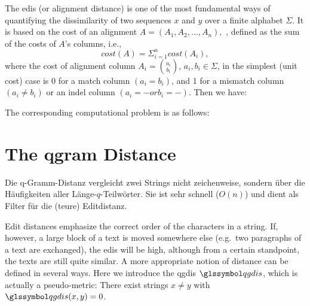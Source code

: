 The \gls{edis} (or \gls{alignment distance}) is one of the most fundamental ways of quantifying the
dissimilarity of two sequences $x$ and $y$ over a finite alphabet $\Sigma$.
It is based on the cost of an alignment $A = (A_1, A_2, \dots , A_n),$ , defined as the sum of the costs of $A$’s
columns,
i.e.,
\[
cost(A) = \Sigma^n_{i=1} cost(A_i),
\]
where the cost of alignment column $A_i = \binom{a_i}{b_i}$, $a_i, b_i \in \Sigma$, in the simplest (unit cost) case is 0 for a match column $(a_i = b_i)$, and 1 for a mismatch column $(a_i \neq b_i)$ or an indel column $(a_i = - or b_i = -)$.
Then we have:


\noindent The corresponding computational problem is as follows:



\section{The \gls{qgram} Distance}\label{sec:the-q-gram-distance}
\begin{idee}
    Die q-Gramm-Distanz vergleicht zwei Strings nicht zeichenweise, sondern über die
    Häufigkeiten aller Länge-$q$-Teilwörter.
    Sie ist sehr schnell ($O(n)$) und dient als
    Filter für die (teure) Editdistanz.
\end{idee}

Edit distances emphasize the correct order of the characters in a string.
If, however, a large block of a text is moved somewhere else (e.g.\ two paragraphs of a text are exchanged), the
\gls{edis} will be high, although from a certain standpoint, the texts are still quite similar.
A more appropriate notion of distance can be defined in several ways.
Here we introduce the \gls{qgdis} $\dqu$, which is actually a pseudo-metric: There exist strings
$x \neq y$ with $\dqu(x, y) = 0$.

